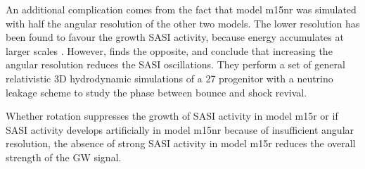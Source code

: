 An additional complication comes from the fact that model m15nr was simulated with half the angular resolution of the other two models. The lower resolution has been found
to favour the growth SASI activity, because energy accumulates at larger scales \citep{hanke_12}.
However, \cite{abdikamalov_15} finds the opposite, and conclude that increasing the angular resolution reduces the SASI oscillations. They perform a set of general relativistic 3D hydrodynamic
simulations of a 27 \msun progenitor with a neutrino leakage scheme to study the phase between bounce and
shock revival.

Whether rotation suppresses the growth of SASI activity in model m15r or if SASI activity develops
artificially in model m15nr because of insufficient angular resolution, the absence of strong SASI activity in model
m15r reduces the overall strength of the GW signal. 

